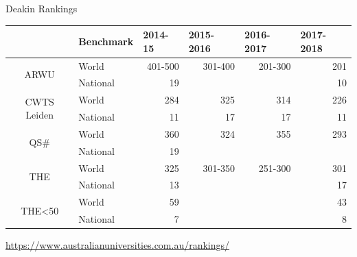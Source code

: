 \documentclass[
 size=14pt,
 paper=smartboard,  %
 mode=present, 		%
 display=slides, 	%
 style=tuliplab,  	%
 pauseslide,
 fleqn,leqno]{powerdot}
\begin{document}
\begin{slide}{Deakin Rankings}
\begin{table}[htbp]
  \setlength{\abovecaptionskip}{-2pt}
  \setlength{\belowcaptionskip}{12pt}
  \centering
    \begin{tabular}{clrrrr}
    \toprule
      & Benchmark & \multicolumn{1}{l}{2014-15} & \multicolumn{1}{l}{2015-2016} & \multicolumn{1}{l}{2016-2017} & \multicolumn{1}{l}{2017-2018} \\ \midrule
    \multirow{2}[0]{*}{ARWU} & World & 401-500 & 301-400 & 201-300 & 201 \\
      & National  & 19 &   &   & 10 \\
      \midrule
    \multirow{2}[0]{*}{CWTS Leiden} & World  & 284 & 325 & 314 & 226 \\
      & National  & 11 & 17 & 17 & 11 \\
      \midrule
    \multirow{2}[0]{*}{QS\#} & World  & 360 & 324 & 355 & 293 \\
      & National & 19 &   &   &  \\
      \midrule
    \multirow{2}[0]{*}{THE} & World  & 325 & 301-350 & 251-300 & 301 \\
      & National  & 13 &   &   & 17 \\
      \midrule
    \multirow{2}[0]{*}{THE<50} & World  & 59 &   &   & 43 \\
      & National  & 7 &   &   & 8 \\
      \bottomrule
    \end{tabular}
  \label{tab:Deakin Ranking}
\end{table}
\centering
\url{https://www.australianuniversities.com.au/rankings/}
\end{slide}
\end{document}
